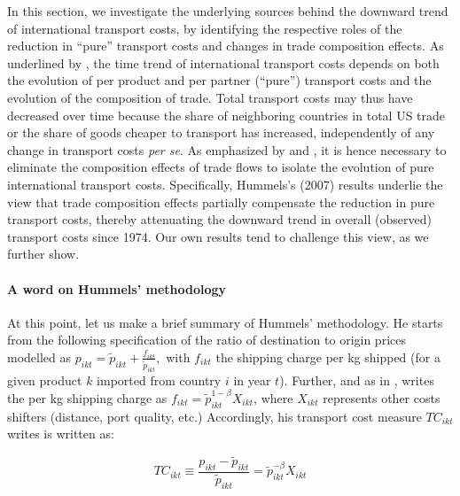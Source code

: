 \documentclass[a4paper,11pt]{article}
\begin{document}
In this section, we investigate the underlying sources behind the downward trend of international transport costs, by identifying the respective roles of the reduction in ``pure'' transport costs and changes in trade composition effects. As underlined by \cite{hummels2007}, the time trend of international transport costs depends on both the evolution of per product and per partner (``pure'') transport costs and the evolution of the composition of trade.
Total transport costs may thus have decreased over time because the share of neighboring countries in total US trade or the share of goods cheaper to transport has increased, independently of any change in transport costs \textit{per se}.
As emphasized by \cite{Hummels_1999} and \cite{hummels2007}, it is hence necessary to eliminate the composition effects of trade flows to isolate the evolution of pure international transport costs.
Specifically, Hummels's (2007) results\nocite{hummels2007} underlie the view that trade composition effects partially compensate the reduction in pure transport costs, thereby attenuating the downward trend in overall (observed) transport costs since 1974.
Our own results tend to challenge this view, as we further show.

\paragraph{A word on Hummels' methodology} At this point, let us make a brief summary of Hummels' methodology\nocite{hummels2007}.
He starts from the following specification of the ratio of destination to origin prices modelled as $p_{ikt} = \widetilde{p}_{ikt}+\frac{f_{ikt}}{ \widetilde{p}_{ikt}},$ with $f_{ikt}$ the shipping charge per kg shipped (for a given product $k$ imported from country $i$ in year $t$).
Further, and as in \cite{hummels_skiba}, \cite{hummels2007} writes the per kg shipping charge as $f_{ikt}=\widetilde{p}_{ikt}^{1-\beta}X_{ikt}$, where $X_{ikt}$ represents other costs shifters (distance, port quality, etc.) Accordingly, his transport cost measure $TC_{ikt}$ writes is written as:

\begin{equation}
TC_{ikt}\equiv \frac{p_{ikt}-\widetilde{p}_{ikt}}{\widetilde{p}_{ikt}} = \widetilde{p}_{ikt}^{-\beta}X_{ikt} \label{eq:Hummel_benchmarkeq}
\end{equation}
\end{document}
